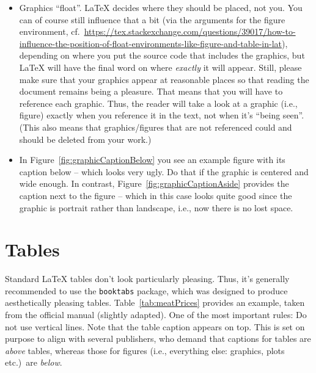 \begin{itemize}
  \item Graphics ``float''. \LaTeX{} decides where they should be placed, not you. You can of course still influence that a bit (via the arguments for the figure environment, cf.~\url{https://tex.stackexchange.com/questions/39017/how-to-influence-the-position-of-float-environments-like-figure-and-table-in-lat}), depending on where you put the source code that includes the graphics, but \LaTeX{} will have the final word on where \emph{exactly} it will appear. Still, please make sure that your graphics appear at reasonable places so that reading the document remains being a pleasure. That means that you will have to reference each graphic. Thus, the reader will take a look at a graphic (i.e., figure) exactly when you reference it in the text, not when it's ``being seen''. (This also means that graphics/figures that are not referenced could and should be deleted from your work.)
  \item In Figure~\ref{fig:graphicCaptionBelow} you see an example figure with its caption below -- which looks very ugly. Do that if the graphic is centered and wide enough. In contrast, Figure~\ref{fig:graphicCaptionAside} provides the caption next to the figure -- which in this case looks quite good since the graphic is portrait rather than landscape, i.e., now there is no lost space.
\end{itemize}



\section{Tables}

Standard \LaTeX{} tables don't look particularly pleasing. Thus, it's generally recommended to use the \verb!booktabs! package, which was designed to produce aesthetically pleasing tables. Table~\ref{tab:meatPrices} provides an example, taken from the official manual (slightly adapted). One of the most important rules: Do not use vertical lines. Note that the table caption appears on top. This is set on purpose to align with several publishers, who demand that captions for tables are \emph{above} tables, whereas those for figures (i.e., everything else: graphics, plots etc.)\ are \emph{below}.
  
